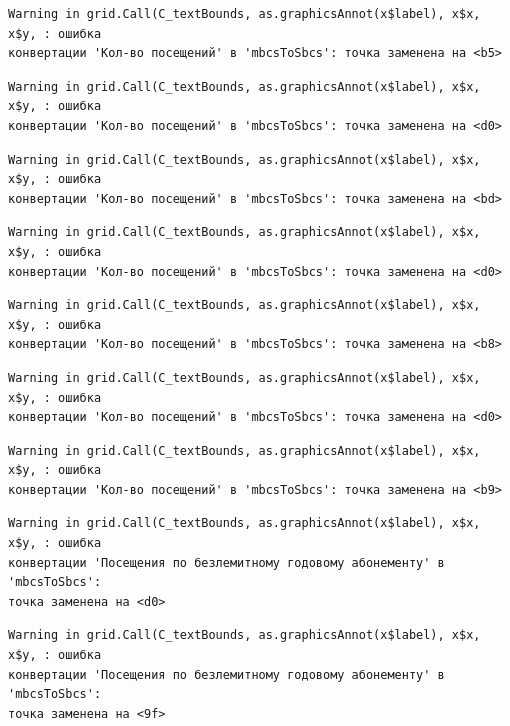 \documentclass[
  letterpaper,
  DIV=11,
  numbers=noendperiod]{scrreprt}
\begin{document}
\begin{verbatim}
Warning in grid.Call(C_textBounds, as.graphicsAnnot(x$label), x$x, x$y, : ошибка
конвертации 'Кол-во посещений' в 'mbcsToSbcs': точка заменена на <b5>
\end{verbatim}

\begin{verbatim}
Warning in grid.Call(C_textBounds, as.graphicsAnnot(x$label), x$x, x$y, : ошибка
конвертации 'Кол-во посещений' в 'mbcsToSbcs': точка заменена на <d0>
\end{verbatim}

\begin{verbatim}
Warning in grid.Call(C_textBounds, as.graphicsAnnot(x$label), x$x, x$y, : ошибка
конвертации 'Кол-во посещений' в 'mbcsToSbcs': точка заменена на <bd>
\end{verbatim}

\begin{verbatim}
Warning in grid.Call(C_textBounds, as.graphicsAnnot(x$label), x$x, x$y, : ошибка
конвертации 'Кол-во посещений' в 'mbcsToSbcs': точка заменена на <d0>
\end{verbatim}

\begin{verbatim}
Warning in grid.Call(C_textBounds, as.graphicsAnnot(x$label), x$x, x$y, : ошибка
конвертации 'Кол-во посещений' в 'mbcsToSbcs': точка заменена на <b8>
\end{verbatim}

\begin{verbatim}
Warning in grid.Call(C_textBounds, as.graphicsAnnot(x$label), x$x, x$y, : ошибка
конвертации 'Кол-во посещений' в 'mbcsToSbcs': точка заменена на <d0>
\end{verbatim}

\begin{verbatim}
Warning in grid.Call(C_textBounds, as.graphicsAnnot(x$label), x$x, x$y, : ошибка
конвертации 'Кол-во посещений' в 'mbcsToSbcs': точка заменена на <b9>
\end{verbatim}

\begin{verbatim}
Warning in grid.Call(C_textBounds, as.graphicsAnnot(x$label), x$x, x$y, : ошибка
конвертации 'Посещения по безлемитному годовому абонементу' в 'mbcsToSbcs':
точка заменена на <d0>
\end{verbatim}

\begin{verbatim}
Warning in grid.Call(C_textBounds, as.graphicsAnnot(x$label), x$x, x$y, : ошибка
конвертации 'Посещения по безлемитному годовому абонементу' в 'mbcsToSbcs':
точка заменена на <9f>
\end{verbatim}
\end{document}
